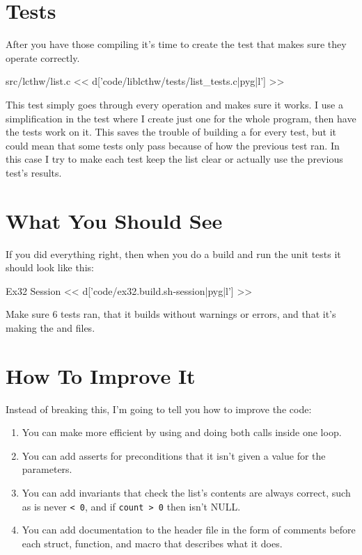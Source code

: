 \section{Tests}

After you have those compiling it's time to create the test that makes sure
they operate correctly.

\begin{code}{src/lcthw/list.c}
<< d['code/liblcthw/tests/list_tests.c|pyg|l'] >>
\end{code}

This test simply goes through every operation and makes sure it works.  I use
a simplification in the test where I create just one  for
the whole program, then have the tests work on it.  This saves the trouble
of building a  for every test, but it could mean that some tests
only pass because of how the previous test ran.  In this case I try to make
each test keep the list clear or actually use the previous test's results.

\section{What You Should See}

If you did everything right, then when you do a build and run the unit tests
it should look like this:

\begin{code}{Ex32 Session}
<< d['code/ex32.build.sh-session|pyg|l'] >>
\end{code}

Make sure 6 tests ran, that it builds without warnings or errors, and that it's
making the  and  files.

\section{How To Improve It}

Instead of breaking this, I'm going to tell you how to improve the code:

\begin{enumerate}
\item You can make  more efficient by using
     and doing both  calls inside one
    loop.
\item You can add asserts for preconditions that it isn't given a 
    value for the  parameters.
\item You can add invariants that check the list's contents are always correct,
    such as  is never \verb|< 0|, and if \verb|count > 0| then  isn't NULL.
\item You can add documentation to the header file in the form of comments before
    each struct, function, and macro that describes what it does.
\end{enumerate}

